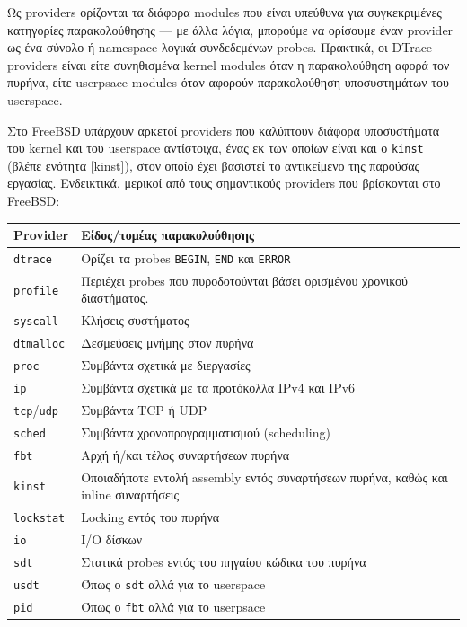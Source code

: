 \documentclass[12pt]{article}
\begin{document}
Ως providers ορίζονται τα διάφορα modules που είναι υπεύθυνα για συγκεκριμένες
κατηγορίες παρακολούθησης --- με άλλα λόγια, μπορούμε να ορίσουμε έναν provider
ως ένα σύνολο ή namespace λογικά συνδεδεμένων probes. Πρακτικά, οι DTrace
providers είναι είτε συνηθισμένα kernel modules όταν η παρακολούθηση αφορά τον
πυρήνα, είτε userpsace modules όταν αφορούν παρακολούθηση υποσυστημάτων του
userspace.

Στο FreeBSD υπάρχουν αρκετοί providers που καλύπτουν διάφορα υποσυστήματα του
kernel και του userspace αντίστοιχα, ένας εκ των οποίων είναι και ο
\lstinline{kinst} (βλέπε ενότητα \ref{kinst}), στον οποίο έχει βασιστεί το
αντικείμενο της παρούσας εργασίας. Ενδεικτικά, μερικοί από τους σημαντικούς
providers που βρίσκονται στο FreeBSD:

\begin{center}
\begin{tabular}{|p{9cm}|p{9cm}|}
	\hline
	\textbf{Provider} & \textbf{Είδος/τομέας παρακολούθησης} \\
	\hline
	\lstinline{dtrace} & Ορίζει τα probes
		\lstinline{BEGIN}, \lstinline{END} και \lstinline{ERROR} \\
	\hline
	\lstinline{profile} & Περιέχει probes που
		πυροδοτούνται βάσει ορισμένου χρονικού διαστήματος. \\
	\hline
	\lstinline{syscall} & Κλήσεις συστήματος \\
	\hline
	\lstinline{dtmalloc} & Δεσμεύσεις μνήμης στον πυρήνα \\
	\hline
	\lstinline{proc} & Συμβάντα σχετικά με διεργασίες \\
	\hline
	\lstinline{ip} & Συμβάντα σχετικά με τα προτόκολλα IPv4 και
		IPv6 \\
	\hline
	\lstinline{tcp}/\lstinline{udp} & Συμβάντα TCP ή UDP \\
	\hline
	\lstinline{sched} & Συμβάντα χρονοπρογραμματισμού (scheduling)
		\\
	\hline
	\lstinline{fbt} & Αρχή ή/και τέλος συναρτήσεων πυρήνα \\
	\hline
	\lstinline{kinst} & Οποιαδήποτε εντολή assembly εντός
		συναρτήσεων πυρήνα, καθώς και inline συναρτήσεις \\
	\hline
	\lstinline{lockstat} & Locking εντός του πυρήνα \\
	\hline
	\lstinline{io} & I/O δίσκων \\
	\hline
	\lstinline{sdt} & Στατικά probes εντός του πηγαίου κώδικα του
		πυρήνα \\
	\hline
	\lstinline{usdt} & Όπως ο \lstinline{sdt} αλλά για το
		userspace \\
	\hline
	\lstinline{pid} & Όπως ο \lstinline{fbt} αλλά για το
		userpsace \\
	\hline
\end{tabular}
\end{center}
\end{document}
